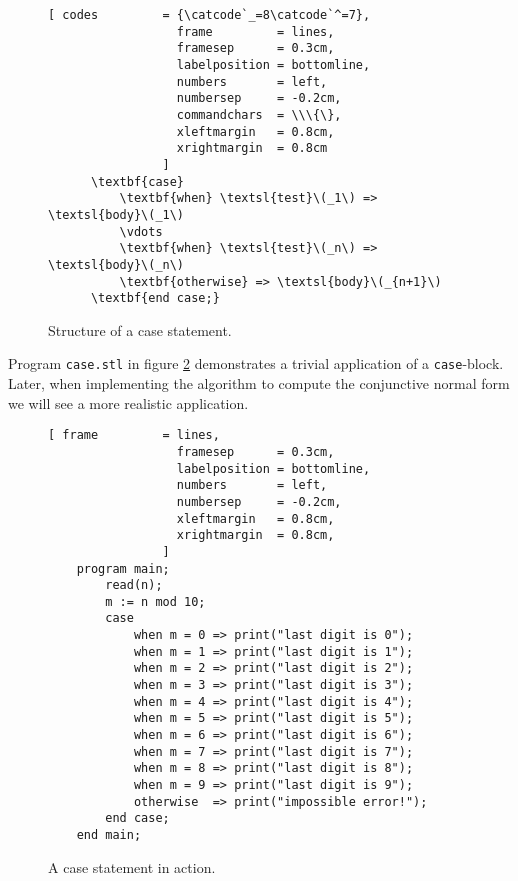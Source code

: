 \begin{figure}[!ht]
  \centering
\begin{Verbatim}[ codes         = {\catcode`_=8\catcode`^=7},
                  frame         = lines, 
                  framesep      = 0.3cm, 
                  labelposition = bottomline,
                  numbers       = left,
                  numbersep     = -0.2cm,
                  commandchars  = \\\{\},
                  xleftmargin   = 0.8cm,
                  xrightmargin  = 0.8cm
                ]
      \textbf{case}
          \textbf{when} \textsl{test}\(_1\) => \textsl{body}\(_1\)
          \vdots
          \textbf{when} \textsl{test}\(_n\) => \textsl{body}\(_n\)
          \textbf{otherwise} => \textsl{body}\(_{n+1}\)
      \textbf{end case;}
\end{Verbatim}
\vspace*{-0.3cm}
\caption{Structure of a  case statement.}  \label{fig:case}
\end{figure} 

Program \texttt{case.stl} in figure \ref{fig:case.stl} demonstrates a trivial application
of a \texttt{case}-block.  Later,
when implementing the algorithm to compute the conjunctive normal form we will see a more
realistic application.

\begin{figure}[!ht]
\centering
\begin{Verbatim}[ frame         = lines, 
                  framesep      = 0.3cm, 
                  labelposition = bottomline,
                  numbers       = left,
                  numbersep     = -0.2cm,
                  xleftmargin   = 0.8cm,
                  xrightmargin  = 0.8cm,
                ]
    program main;
        read(n);
        m := n mod 10;
        case
            when m = 0 => print("last digit is 0");
            when m = 1 => print("last digit is 1");
            when m = 2 => print("last digit is 2");
            when m = 3 => print("last digit is 3");
            when m = 4 => print("last digit is 4");
            when m = 5 => print("last digit is 5");
            when m = 6 => print("last digit is 6");
            when m = 7 => print("last digit is 7");
            when m = 8 => print("last digit is 8");
            when m = 9 => print("last digit is 9");
            otherwise  => print("impossible error!");
        end case;
    end main;
\end{Verbatim}
\vspace*{-0.3cm}
\caption{A case statement in action.}
\label{fig:case.stl}
\end{figure}

